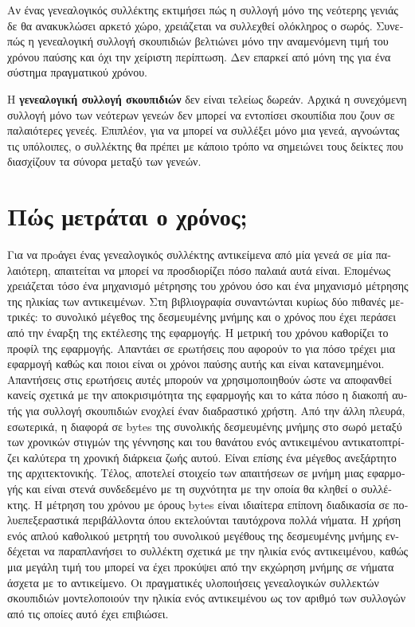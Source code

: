 \begin{greek}
Αν ένας γενεαλογικός συλλέκτης εκτιμήσει πώς η συλλογή μόνο
της νεότερης γενιάς δε θα ανακυκλώσει αρκετό χώρο, χρειάζεται
να συλλεχθεί ολόκληρος ο σωρός. Συνεπώς η γενεαλογική συλλογή
σκουπιδιών βελτιώνει μόνο την αναμενόμενη τιμή του χρόνου παύσης
και όχι την χείριστη περίπτωση. Δεν επαρκεί από μόνη της για ένα
σύστημα πραγματικού χρόνου.

Η \textbf{γενεαλογική συλλογή σκουπιδιών} δεν είναι τελείως
δωρεάν. Αρχικά η συνεχόμενη συλλογή μόνο των νεότερων γενεών
δεν μπορεί να εντοπίσει σκουπίδια που ζουν σε παλαιότερες γενεές.
Επιπλέον, για να μπορεί να συλλέξει μόνο μια γενεά, αγνοώντας
τις υπόλοιπες, ο συλλέκτης θα πρέπει με κάποιο τρόπο να σημειώνει
τους δείκτες που διασχίζουν τα σύνορα μεταξύ των γενεών.

\section{Πώς μετράται ο χρόνος;}
Για να πρoάγει ένας γενεαλογικός συλλέκτης αντικείμενα από μία γενεά σε μία 
παλαιότερη, απαιτείται να μπορεί να προσδιορίζει πόσο παλαιά αυτά είναι. 
Επομένως χρειάζεται τόσο ένα μηχανισμό μέτρησης του χρόνου όσο και ένα μηχανισμό 
μέτρησης της ηλικίας των αντικειμένων. Στη βιβλιογραφία συναντώνται κυρίως δύο 
πιθανές μετρικές: το συνολικό μέγεθος της δεσμευμένης μνήμης και ο χρόνος που 
έχει περάσει από την έναρξη της εκτέλεσης της εφαρμογής. Η μετρική του χρόνου 
καθορίζει το προφίλ της εφαρμογής. Απαντάει σε ερωτήσεις που αφορούν το για πόσο 
τρέχει μια εφαρμογή καθώς και ποιοι είναι οι χρόνοι παύσης αυτής και είναι 
κατανεμημένοι. Απαντήσεις στις ερωτήσεις αυτές μπορούν να χρησιμοποιηθούν ώστε 
να αποφανθεί κανείς σχετικά με την αποκρισιμότητα της εφαρμογής και το κάτα πόσο 
η διακοπή αυτής για συλλογή σκουπιδιών ενοχλεί έναν διαδραστικό χρήστη. Από την 
άλλη πλευρά, εσωτερικά, η διαφορά σε bytes της συνολικής δεσμευμένης μνήμης στο 
σωρό μεταξύ των χρονικών στιγμών της γέννησης και του θανάτου ενός αντικειμένου 
αντικατοπτρίζει καλύτερα τη χρονική διάρκεια ζωής αυτού. Είναι επίσης ένα μέγεθος 
ανεξάρτητο της αρχιτεκτονικής. Τέλος, αποτελεί στοιχείο των απαιτήσεων σε μνήμη 
μιας εφαρμογής και είναι στενά συνδεδεμένο με τη συχνότητα με την οποία θα κληθεί 
ο συλλέκτης. Η μέτρηση του χρόνου με όρους bytes είναι ιδιαίτερα επίπονη διαδικασία 
σε πολυεπεξεραστικά περιβάλλοντα όπου εκτελούνται ταυτόχρονα πολλά νήματα. Η χρήση 
ενός απλού καθολικού μετρητή του συνολικού μεγέθους της δεσμευμένης μνήμης ενδέχεται 
να παραπλανήσει το συλλέκτη σχετικά με την ηλικία ενός αντικειμένου, καθώς μια 
μεγάλη τιμή του μπορεί να έχει προκύψει από την εκχώρηση μνήμης σε νήματα άσχετα 
με το αντικείμενο. Οι πραγματικές υλοποιήσεις γενεαλογικών συλλεκτών σκουπιδιών 
μοντελοποιούν την ηλικία ενός αντικειμένου ως τον αριθμό των συλλογών από τις 
οποίες αυτό έχει επιβιώσει.


\end{greek}
